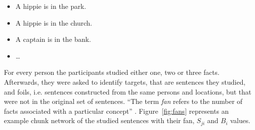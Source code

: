 \begin{itemize}
 \item A hippie is in the park.
 \item A hippie is in the church.
 \item A captain is in the bank.
 \item \dots
\end{itemize}

For every person the participants studied either one, two or three facts. Afterwards, they were asked to identify targets, that are sentences they studied, and foils, i.e. sentences constructed from the same persons and locations, but that were not in the original set of sentences. ``The term \emph{fan} refers to the number of facts associated with a particular concept'' \cite[186]{anderson_fan_1999}. Figure~\ref{fig:fans} represents an example chunk network of the studied sentences with their fan, $S_{ji}$ and $B_i$ values.

